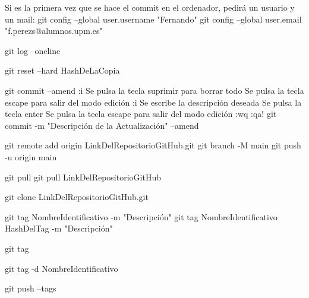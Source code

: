 	Si es la primera vez que se hace el commit en el ordenador, pedirá un usuario y un mail:
	git config --global user.username "Fernando"
	git config --global user.email "f.perezs@alumnos.upm.es"

	git log --oneline	%

	git reset --hard HashDeLaCopia	%

	git commit --amend		%
		:i		%
		Se pulsa la tecla suprimir para borrar todo
		Se pulsa la tecla escape para salir del modo edición
		:i		%
		Se escribe la descripción deseada
		Se pulsa la tecla enter
		Se pulsa la tecla escape para salir del modo edición
		:wq		%
		:qa!	%
	git commit -m "Descripción de la Actualización" --amend		%



	git remote add origin LinkDelRepositorioGitHub.git		%
	git branch -M main
	git push -u origin main									%

	git pull							%
	git pull LinkDelRepositorioGitHub	%

	git clone LinkDelRepositorioGitHub.git		%


	git tag NombreIdentificativo -m "Descripción"				%
	git tag NombreIdentificativo HashDelTag -m "Descripción"	%

	git tag		%

	git tag -d NombreIdentificativo

	git push --tags		%





